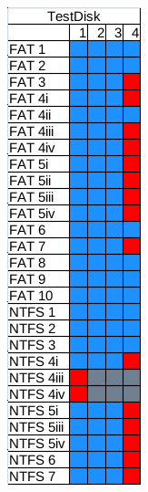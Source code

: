 \begin{figure}[h!]
    
    \begin{subfigure}{0.3\linewidth}
        \includegraphics[width=\linewidth]{fig/testdisk_results.png}

\end{subfigure}
\end{figure}
